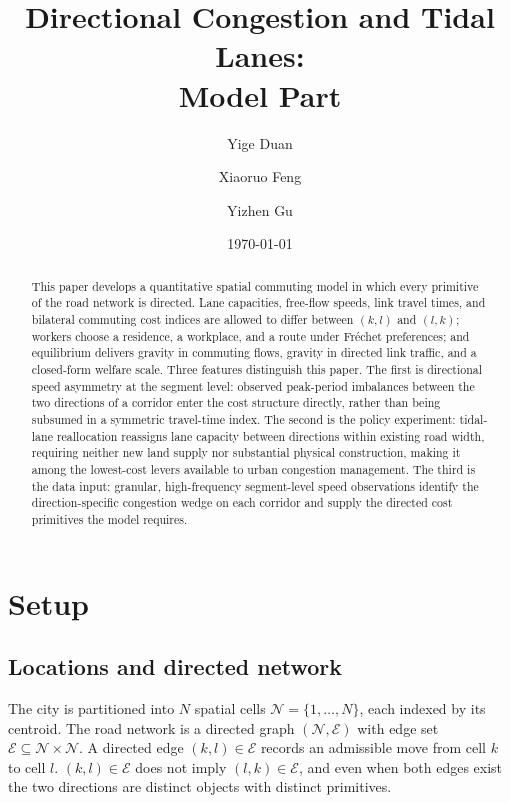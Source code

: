\documentclass[12pt]{article}
\title{Directional Congestion and Tidal Lanes:\\
Model Part}
\author{Yige Duan \and Xiaoruo Feng \and Yizhen Gu}
\date{\today}
\newcommand{\N}{\mathcal N}
\newcommand{\E}{\mathcal E}
\begin{document}
\maketitle

\begin{abstract}
\noindent
This paper develops a quantitative spatial commuting model in which every primitive of the road network is directed. Lane capacities, free-flow speeds, link travel times, and bilateral commuting cost indices are allowed to differ between $(k,l)$ and $(l,k)$; workers choose a residence, a workplace, and a route under Fréchet preferences; and equilibrium delivers gravity in commuting flows, gravity in directed link traffic, and a closed-form welfare scale. Three features distinguish this paper. The first is directional speed asymmetry at the segment level: observed peak-period imbalances between the two directions of a corridor enter the cost structure directly, rather than being subsumed in a symmetric travel-time index. The second is the policy experiment: tidal-lane reallocation reassigns lane capacity between directions within existing road width, requiring neither new land supply nor substantial physical construction, making it among the lowest-cost levers available to urban congestion management. The third is the data input: granular, high-frequency segment-level speed observations identify the direction-specific congestion wedge on each corridor and supply the directed cost primitives the model requires.
\end{abstract}

\tableofcontents
\clearpage

\section{Setup}\label{sec:setup}

\subsection{Locations and directed network}

The city is partitioned into $N$ spatial cells $\N=\{1,\dots,N\}$,
each indexed by its centroid.  The road network is a directed graph
$(\N,\E)$ with edge set $\E\subseteq\N\times\N$.  A directed edge
$(k,l)\in\E$ records an admissible move from cell $k$ to cell $l$.
$(k,l)\in\E$ does not imply $(l,k)\in\E$, and even when both edges
exist the two directions are distinct objects with distinct
primitives.
\end{document}

